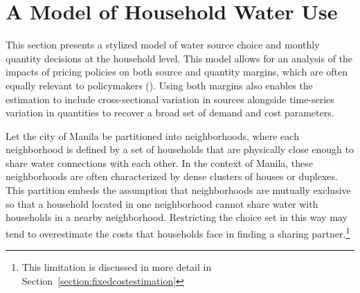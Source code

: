 \documentclass[12pt]{article}
\begin{document}










\section{A Model of Household Water Use}\label{section:modelofhouseholdwateruse}

This section presents a stylized model of water source choice and monthly quantity decisions at the household level.  This model allows for an analysis of the impacts of pricing policies on both source and quantity margins, which are often equally relevant to policymakers (\cite{mcintosh2003asian,komives2005water}).  Using both margins also enables the estimation to include cross-sectional variation in sources alongside time-series variation in quantities to recover a broad set of demand and cost parameters.

Let the city of Manila be partitioned into neighborhoods, where each neighborhood is defined by a set of households that are physically close enough to share water connections with each other.  In the context of Manila, these neighborhoods are often characterized by dense clusters of houses or duplexes.  This partition embeds the assumption that neighborhoods are mutually exclusive so that a household located in one neighborhood cannot share water with households in a nearby neighborhood.  Restricting the choice set in this way may tend to overestimate the costs that households face in finding a sharing partner.\footnote{This limitation is discussed in more detail in Section~\ref{section:fixedcostestimation}}
\end{document}
